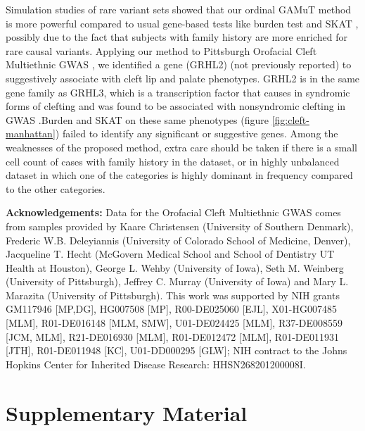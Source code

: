 \documentclass[]{article}
\begin{document}
Simulation studies of rare variant sets showed that our ordinal GAMuT method is more powerful compared to usual gene-based tests like burden test \citep{Li2008, Madsen2009} and SKAT \citep{Wu2011}, possibly due to the fact that subjects with family history are more enriched for rare causal variants. Applying our method to Pittsburgh Orofacial Cleft Multiethnic GWAS \citep{Leslie2016, Leslie2016b}, we identified a gene (GRHL2) (not previously reported) to suggestively associate with cleft lip and palate phenotypes. GRHL2 is in the same gene family as GRHL3, which is a transcription factor that causes in syndromic forms of clefting and was found to be associated with nonsyndromic clefting in GWAS \citep{Leslie2016, Leslie2016b, Carpinelli2017, PeyrardJanvid2014}.Burden and SKAT on these same phenotypes (figure \ref{fig:cleft-manhattan}) failed to identify any significant or suggestive genes. Among the weaknesses of the proposed method, extra care should be taken if there is a small cell count of cases with family history in the dataset, or in highly unbalanced dataset in which one of the categories is highly dominant in frequency compared to the other categories.

\textbf{Acknowledgements:} Data for the Orofacial Cleft Multiethnic GWAS comes from samples provided by Kaare Christensen (University of Southern Denmark), Frederic W.B. Deleyiannis (University of Colorado School of Medicine, Denver), Jacqueline T. Hecht (McGovern Medical School and School of Dentistry UT Health at Houston), George L. Wehby (University of Iowa), Seth M. Weinberg (University of Pittsburgh), Jeffrey C. Murray (University of Iowa) and Mary L. Marazita (University of Pittsburgh).
This work was supported by NIH grants GM117946 {[}MP,DG{]}, HG007508 {[}MP{]}, R00-DE025060 {[}EJL{]}, X01-HG007485 {[}MLM{]}, R01-DE016148 {[}MLM, SMW{]}, U01-DE024425 {[}MLM{]}, R37-DE008559 {[}JCM, MLM{]}, R21-DE016930 {[}MLM{]}, R01-DE012472 {[}MLM{]}, R01-DE011931 {[}JTH{]}, R01-DE011948 {[}KC{]}, U01-DD000295 {[}GLW{]}; NIH contract to the Johns Hopkins Center for Inherited Disease Research: HHSN268201200008I.

\newpage

\hypertarget{supplementary-material}{%
\section*{Supplementary Material}\label{supplementary-material}}
\end{document}
